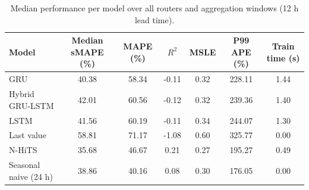 \begin{table}[t]
\caption{Median performance per model over all routers and aggregation windows (12 h lead time).}
\label{tab:models}
\centering
\begin{tabular}{lcccccc}
\hline
\textbf{Model} & \textbf{Median sMAPE (\%)} & \textbf{MAPE (\%)} & \textbf{$R^2$} & \textbf{MSLE} & \textbf{P99 APE (\%)} & \textbf{Train time (s)} \\
\hline
GRU & 40.38 & 58.34 & -0.11 & 0.32 & 228.11 & 1.44 \\
Hybrid GRU-LSTM & 42.01 & 60.56 & -0.12 & 0.32 & 239.36 & 1.40 \\
LSTM & 41.56 & 60.19 & -0.11 & 0.34 & 244.07 & 1.30 \\
Last value & 58.81 & 71.17 & -1.08 & 0.60 & 325.77 & 0.00 \\
N-HiTS & 35.68 & 46.67 & 0.21 & 0.27 & 195.27 & 0.49 \\
Seasonal naive (24 h) & 38.86 & 40.16 & 0.08 & 0.30 & 176.05 & 0.00 \\
\hline
\end{tabular}
\end{table}
